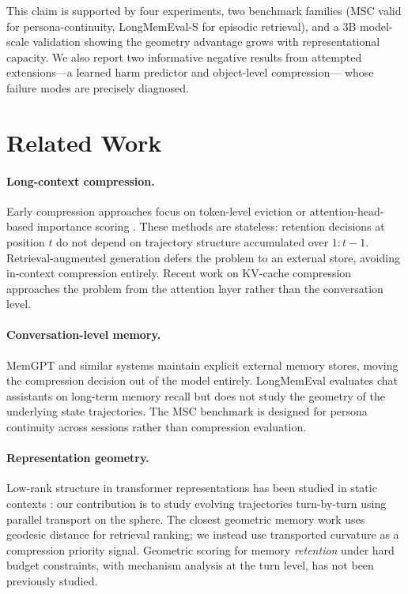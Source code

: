 \documentclass[conference]{IEEEtran}
\begin{document}
This claim is supported by four experiments, two benchmark families (MSC valid
for persona-continuity, LongMemEval-S for episodic retrieval), and a
3B model-scale validation showing the geometry advantage grows with
representational capacity. We also report two informative negative results from
attempted extensions---a learned harm predictor and object-level compression---
whose failure modes are precisely diagnosed.

\section{Related Work}
\label{sec:related}

\paragraph{Long-context compression.}
Early compression approaches focus on token-level eviction
\cite{scissorhands,streamingllm} or attention-head-based importance
scoring \cite{h2o}. These methods are stateless: retention decisions at
position $t$ do not depend on trajectory structure accumulated over
$1{:}t{-}1$. Retrieval-augmented generation \cite{rag} defers the
problem to an external store, avoiding in-context compression entirely.
Recent work on KV-cache compression \cite{kvcache} approaches the
problem from the attention layer rather than the conversation level.

\paragraph{Conversation-level memory.}
MemGPT \cite{memgpt} and similar systems maintain explicit external
memory stores, moving the compression decision out of the model entirely.
LongMemEval \cite{longmemeval} evaluates chat assistants on long-term memory recall
but does not study the geometry of the underlying state trajectories. The
MSC benchmark \cite{msc} is designed for persona continuity across
sessions rather than compression evaluation.

\paragraph{Representation geometry.}
Low-rank structure in transformer representations has been studied in
static contexts \cite{intrinsic}: our contribution is to study evolving
trajectories turn-by-turn using parallel transport on the sphere. The
closest geometric memory work \cite{geodesic} uses geodesic
distance for retrieval ranking; we instead use transported curvature as a
compression priority signal. Geometric scoring for memory \emph{retention}
under hard budget constraints, with mechanism analysis at the turn level,
has not been previously studied.
\end{document}
